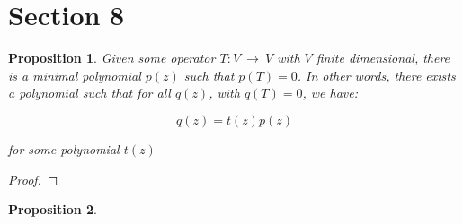 \documentclass[10pt, oneside]{article}
\newtheorem{prop}{Proposition}
\begin{document}
    \section{Section 8}

    \begin{prop}
      Given some operator $T : V \ \rightarrow \ V$ with $V$ finite dimensional, there is a minimal polynomial $p(z)$ such that
      $p(T) = 0$. In other words, there exists a polynomial such that for all $q(z)$, with $q(T) = 0$, we have:

      $$q(z) = t(z) p(z)$$

      for some polynomial $t(z)$
    \end{prop}

    \begin{proof}

    \end{proof}

    \begin{prop}
      
      \end{prop}

    
\end{document}
